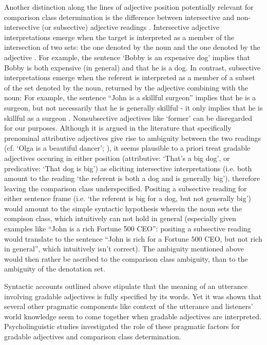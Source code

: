 Another distinction along the lines of adjective position potentially relevant for comparison class determination is the difference between intersective and non-intersective (or subsective) adjective readings \parencite{kennedy2012, hofherr2010adjectives}. 
Intersective adjective interpretations emerge when the target is interpreted as a member of the intersection of two sets: the one denoted by the noun and the one denoted by the adjective \parencite{kennedy2012}. For example, the sentence ‘Bobby is an expensive dog’ implies that Bobby is both expensive (in general) and that he is a dog. 
In contrast, subsective interpretations emerge when the referent is interpreted as a member of a subset of the set denoted by the noun, returned by the adjective combining with the noun: For example, the sentence “John is a skillful surgeon” implies that he is a surgeon, but not necessarily that he is generally skillful - it only implies that he is skillful as a surgeon \parencite{kennedy2012}. Nonsubsective adjectives like ‘former’ can be disregarded for our purposes. 
Although it is argued in the literature that specifically prenominal attributive adjectives give rise to ambiguity between the two readings (cf. ‘Olga is a beautiful dancer’; \cite{hofherr2010adjectives}), it seems plausible to a priori treat gradable adjectives occuring in either position (attributive: ‘That’s a big dog’, or predicative: ‘That dog is big’) as eliciting intersective interpretations (i.e. both amount to the reading ‘the referent is both a dog and is generally big’), therefore leaving the comparison class underspecified. Positing a subsective reading for either sentence frame (i.e. ‘the referent is big for a dog, but not generally big’) would amount to the simple syntactic hypothesis wherein the noun sets the compison class, which intuitively can not hold in general (especially given examples like “John is a rich Fortune 500 CEO”: positing a subsective reading would translate to the sentence “John is rich for a Fortune 500 CEO, but not rich in general”, which intuitively isn’t correct). The ambiguity mentioned above would then rather be ascribed to the comparison class ambiguity, than to the ambiguity of the denotation set. 

Syntactic accounts outlined above stipulate that the meaning of an utterance involving gradable adjectives is fully specified by its words. Yet it was shown that several other pragmatic components like context of the utterance and listeners’ world knowledge seem to come together when gradable adjectives are interpreted. Psycholinguistic studies investigated the role of these pragmatic factors for gradable adjectives and comparison class determination. 

